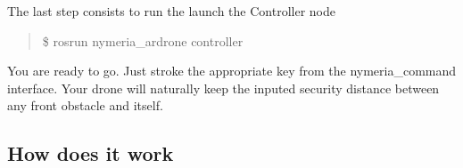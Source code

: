 The last step consists to run the launch the Controller node \begin{quote}
\$ rosrun nymeria\+\_\+ardrone controller \end{quote}


You are ready to go. Just stroke the appropriate key from the nymeria\+\_\+command interface. Your drone will naturally keep the inputed security distance between any front obstacle and itself.

\subsection*{How does it work}